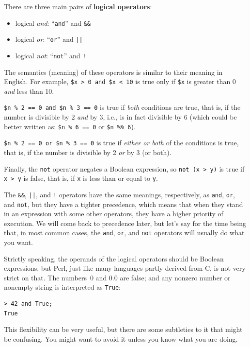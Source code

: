 There are three main pairs of {\bf logical operators}: 
\begin{itemize}
\item logical \emph{and}: ``{\tt and}'' and {\tt \&\&}
\item logical \emph{or}: ``{\tt or}'' and {\tt ||}
\item logical \emph{not}: ``{\tt not}'' and {\tt !}
\end{itemize}

The semantics (meaning) of these operators is
similar to their meaning in English.  For example,
{\tt \$x > 0 and \$x < 10} is true only if {\tt \$x} is greater 
than 0 {\em and} less than 10.

{\tt \$n \% 2 == 0 and \$n \% 3 == 0} is true if {\em both} 
conditions are true, that is, if the number is divisible by 2
{\em and} by 3, i.e., is in fact divisible by 6 (which could be better 
written as: {\tt \$n \% 6 == 0} or {\tt \$n \%\% 6}).

{\tt \$n \% 2 == 0 or \$n \% 3 == 0} is true if {\em either or 
both} of the conditions is true, that is, if the number is 
divisible by 2 {\em or} by 3 (or both).

Finally, the {\tt not} operator negates a Boolean
expression, so {\tt not (x > y)} is true if {\tt x > y} 
is false, that is, if {\tt x} is less than or equal 
to {\tt y}.

The {\tt \&\&}, {\tt ||}, and {\tt !} operators have the same 
meanings, respectively, as {\tt and}, {\tt or}, and {\tt not}, 
but they have a tighter precedence, which means that when 
they stand in an expression with some other operators, 
they have a higher priority of execution. We will come 
back to precedence later, but let's say for the time being 
that, in most common cases, the {\tt and}, {\tt or}, and 
{\tt not} operators will usually do what you want.

Strictly speaking, the operands of the logical operators should 
be Boolean expressions, but Perl, just like many languages 
partly derived from C, is not very strict on that. The 
numbers~0 and 0.0 are false; and any nonzero number 
or nonempty string is interpreted as {\tt True}:

\begin{verbatim}
> 42 and True;
True
\end{verbatim}
%
This flexibility can be very useful, but there are some 
subtleties to it that might be confusing.  You might want 
to avoid it unless you know what you are doing.

